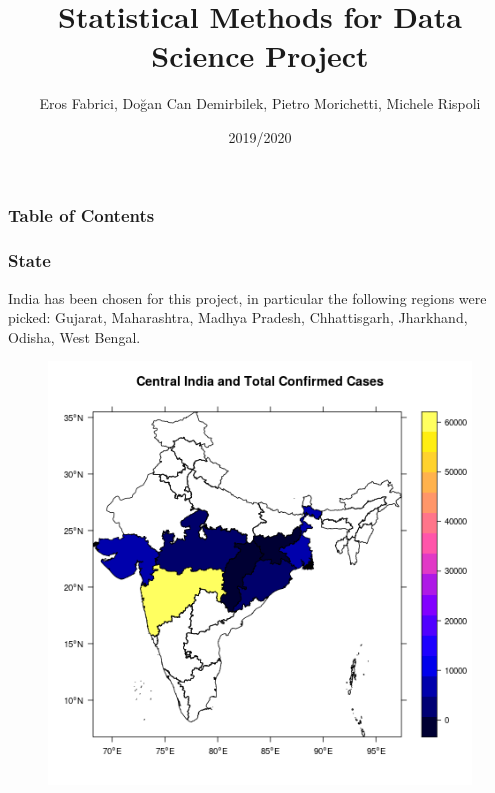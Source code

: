\documentclass{beamer}
\title{Statistical Methods for Data Science Project}
\author{Eros Fabrici, Doğan Can Demirbilek, Pietro Morichetti, Michele Rispoli}
\institute{University of Trieste}
\date{2019/2020}
\begin{document}
\frame{\titlepage}

\begin{frame}
\frametitle{Table of Contents}
\tableofcontents
\end{frame}

\begin{frame}
\frametitle{State}
India has been chosen for this project, in particular the following regions were picked: Gujarat, Maharashtra, Madhya Pradesh, Chhattisgarh, Jharkhand, Odisha, West Bengal.
\end{frame}

\begin{frame}
\begin{figure}
	\includegraphics[width=\linewidth, height=\textheight]{../plots/map_plot.png}
\end{figure}
\end{frame}
\end{document}
